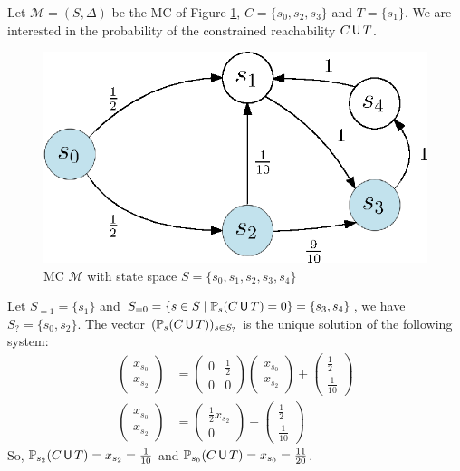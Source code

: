 \begin{example} \label{constrained-reach-example}
Let $\mathcal{M}=(S, \Delta)$ be the MC of Figure \ref{CUTexample},
 $C = \{s_0, s_2, s_3\}$ and $T = \{s_1\}$. We are interested in the probability of the constrained reachability $C \,\text{\sffamily U}\, T$.
  \begin{figure}[H]
    \centering
    \includegraphics[width=0.4\linewidth]{resources/CUTexample}
    \captionsetup{justification=centering}
    \caption{MC $\mathcal{M}$ with state space $S = \{s_0, s_1, s_2, s_3, s_4\}$}\label{CUTexample}
  \end{figure}
  Let $S_{=1} = \{s_1\}$ and $S_{=0} = \{s \in S \; | \; \mathbb{P}_{s}(C\,\text{\sffamily U}\, T)=0\} = \{s_3, s_4\}$, we have $S_{?} = \{s_0, s_2\}$.
  The vector $(\mathbb{P}_{s}(C \,\text{\sffamily U}\, T))_{s \in S_?}$ is the unique solution of the following system:
  \begin{align*}
  	\begin{pmatrix}
      x_{s_0}\\[0.3em]
      x_{s_2}
  	\end{pmatrix} &=
    \begin{pmatrix}
      0 & \frac{1}{2} \\[0.3em]
      0 & 0
    \end{pmatrix}
    \begin{pmatrix}
      x_{s_0}\\[0.3em]
      x_{s_2}
    \end{pmatrix}
    +
    \begin{pmatrix}
      \frac{1}{2}\\[0.3em]
      \frac{1}{10}
    \end{pmatrix} \\
    \begin{pmatrix}
      x_{s_0}\\[0.3em]
      x_{s_2}
  	\end{pmatrix} &=
    \begin{pmatrix}
      \frac{1}{2} x_{s_2} \\[0.3em]
      0
    \end{pmatrix}
    +
    \begin{pmatrix}
      \frac{1}{2}\\[0.3em]
      \frac{1}{10}
    \end{pmatrix}
  \end{align*}
  So, $\mathbb{P}_{s_2}(C \,\text{\sffamily U}\, T) = x_{s_2} = \frac{1}{10}$ and $\mathbb{P}_{s_0}(C \,\text{\sffamily U}\, T) = x_{s_0} = \frac{11}{20}$.
  \\
\end{example}

